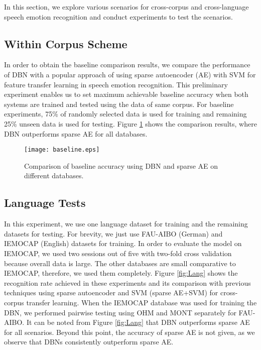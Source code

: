\documentclass[a4paper]{article}
\newcommand*{\RR}[1]{\textcolor{purple}{#1}}
\begin{document}
In this section, we explore various scenarios for cross-corpus and cross-language speech emotion recognition and conduct experiments to test the scenarios.  %

\subsection{Within Corpus Scheme}
In order to obtain the baseline comparison results, we compare the performance of DBN with a popular approach of using sparse autoencoder (AE) with SVM for feature transfer learning in speech emotion recognition\cite{deng2013sparse}. This preliminary experiment enables us to set maximum achievable baseline accuracy when both systems are trained and tested using the data of same corpus. %
For baseline experiments, 75\% of randomly selected data is used for training and remaining 25\% unseen data is used for testing. 
Figure \ref{fig:base} shows the comparison results, where DBN  outperforms sparse AE for all databases. %



\begin{figure}[!ht]
\centering
\centerline{\texttt{[image: baseline.eps]}}
\caption{Comparison of baseline accuracy using DBN and sparse AE on different databases.}
\label{fig:base}
\end{figure}
\subsection{Language Tests}
In this experiment, we use one language dataset for training and the remaining datasets for testing. For brevity, we just use FAU-AIBO (German) and IEMOCAP (English) datasets for training. %
In order to evaluate the model on IEMOCAP, we used two sessions out of five with two-fold cross validation because overall data is large. The other databases are small comparative to IEMOCAP, therefore, we used them completely. Figure \ref{fig:Lang} shows the recognition rate achieved in these experiments and its comparison with previous techniques using sparse autoencoder and SVM (sparse AE+SVM) for cross-corpus transfer learning. When the IEMOCAP database was used for training the DBN, we performed pairwise testing using OHM and MONT separately for FAU-AIBO. It can be noted from Figure \ref{fig:Lang} that DBN outperforms sparse AE for all scenarios. Beyond this point, the accuracy of sparse AE is not given, as we observe that DBNs consistently outperform sparse AE.
\end{document}
